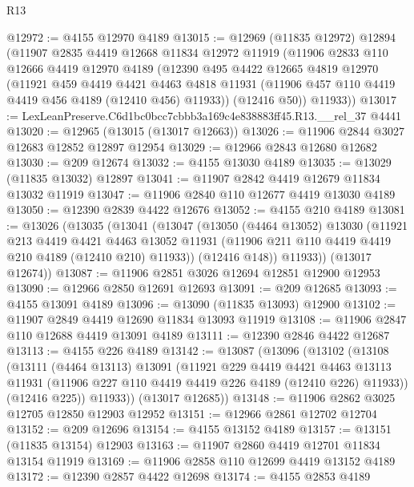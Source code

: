 \begin{lexlean}{R13}
\begin{coremodule}
@12972 := @4155 @12970 @4189
@13015 := @12969
    (@11835 @12972)
    @12894
    (@11907
      @2835
      @4419
      @12668
      @11834
      @12972
      @11919
      (@11906
        @2833
        @110
        @12666
        @4419
        @12970
        @4189
        (@12390
          @495
          @4422
          @12665
          @4819
          @12970
          (@11921
            @459
            @4419
            @4421
            @4463
            @4818
            @11931
            (@11906 @457 @110 @4419 @4419 @456 @4189 (@12410 @456) @11933))
          (@12416 @50))
        @11933))
@13017 := LexLeanPreserve.C6d1bc0bcc7cbbb3a169c4e838883ff45.R13.__rel_37 @4441
@13020 := @12965 (@13015 (@13017 @12663))
@13026 := @11906 @2844 @3027 @12683 @12852 @12897 @12954
@13029 := @12966 @2843 @12680 @12682
@13030 := @209 @12674
@13032 := @4155 @13030 @4189
@13035 := @13029 (@11835 @13032) @12897
@13041 := @11907 @2842 @4419 @12679 @11834 @13032 @11919
@13047 := @11906 @2840 @110 @12677 @4419 @13030 @4189
@13050 := @12390 @2839 @4422 @12676
@13052 := @4155 @210 @4189
@13081 := @13026
    (@13035
      (@13041
        (@13047
          (@13050
            (@4464 @13052)
            @13030
            (@11921
              @213
              @4419
              @4421
              @4463
              @13052
              @11931
              (@11906 @211 @110 @4419 @4419 @210 @4189 (@12410 @210) @11933))
            (@12416 @148))
          @11933))
      (@13017 @12674))
@13087 := @11906 @2851 @3026 @12694 @12851 @12900 @12953
@13090 := @12966 @2850 @12691 @12693
@13091 := @209 @12685
@13093 := @4155 @13091 @4189
@13096 := @13090 (@11835 @13093) @12900
@13102 := @11907 @2849 @4419 @12690 @11834 @13093 @11919
@13108 := @11906 @2847 @110 @12688 @4419 @13091 @4189
@13111 := @12390 @2846 @4422 @12687
@13113 := @4155 @226 @4189
@13142 := @13087
    (@13096
      (@13102
        (@13108
          (@13111
            (@4464 @13113)
            @13091
            (@11921
              @229
              @4419
              @4421
              @4463
              @13113
              @11931
              (@11906 @227 @110 @4419 @4419 @226 @4189 (@12410 @226) @11933))
            (@12416 @225))
          @11933))
      (@13017 @12685))
@13148 := @11906 @2862 @3025 @12705 @12850 @12903 @12952
@13151 := @12966 @2861 @12702 @12704
@13152 := @209 @12696
@13154 := @4155 @13152 @4189
@13157 := @13151 (@11835 @13154) @12903
@13163 := @11907 @2860 @4419 @12701 @11834 @13154 @11919
@13169 := @11906 @2858 @110 @12699 @4419 @13152 @4189
@13172 := @12390 @2857 @4422 @12698
@13174 := @4155 @2853 @4189

\end{coremodule}
\end{lexlean}

